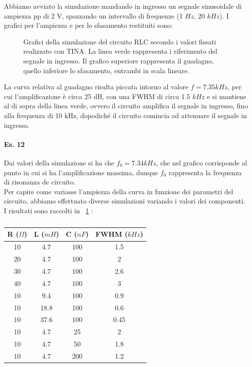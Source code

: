 \documentclass[journal, a4paper]{IEEEtran}
\begin{document}
Abbiamo avviato la simulazione mandando in ingresso un segnale sinusoidale di ampiezza pp di 2 V, spazzando un intervallo di frequenze (1 $Hz$, 20 $kHz$). I grafici per l'ampiezza e per lo sfasamento restituiti sono:

\begin{figure}[htp]
\label{fig:fig1}

\centering


\caption{Grafici della simulazione del circuito RLC secondo i valori fissati realizzato con TINA. La linea verde rappresenta i riferimento del segnale in ingresso. Il grafico superiore rappresenta il guadagno, quello inferiore lo sfasamento, entrambi in scala lineare.}

\end{figure}

La curva relativa al guadagno risulta piccata intorno al valore $f=7.35 kHz$, per cui l'amplificazione è circa 25 dB, con una FWHM di circa 1.5 $kHz$ e si mantiene al di sopra della linea verde, ovvero il circuito amplifica il segnale in ingresso, fino alla frequenza di 10 kHz, dopodiché il circuito comincia ad attenuare il segnale in ingresso.

\paragraph{Es. 12}
Dai valori della simulazione si ha che $f_0 = 7.34 kHz$, che nel grafico corrisponde al punto in cui si ha l'amplificazione massima, dunque $f_0$ rappresenta la frequenza di risonanza de circuito.\\
Per capire come variasse l'ampiezza della curva in funzione dei parametri del circuito, abbiamo effettuato diverse simulazioni variando i valori dei componenti. I risultati sono raccolti in ~\ref{tab:tab1} :\\

\begin{table}[htp]
\label{tab:tab1}
\caption{}
\begin{tabular}{c|c|c|c}
\hline 
R ($\Omega$) & L ($mH$) & C ($nF$) & FWHM ($kHz$) \\ 
\hline 
10 & 4.7 & 100 & 1.5 \\ 
\hline 
20 & 4.7 & 100 & 2 \\ 
\hline 
30 & 4.7 & 100 & 2.6 \\ 
\hline 
40 & 4.7 & 100 & 3 \\ 
\hline 
10 & 9.4 & 100 & 0.9 \\ 
\hline 
10 & 18.8 & 100 & 0.6 \\ 
\hline 
10 & 37.6 & 100 & 0.45 \\ 
\hline 
10 & 4.7 & 25 & 2 \\ 
\hline 
10 & 4.7 & 50 & 1.8 \\ 
\hline 
10 & 4.7 & 200 & 1.2 \\
\hline
\end{tabular} 
\centering
\end{table}
\end{document}
